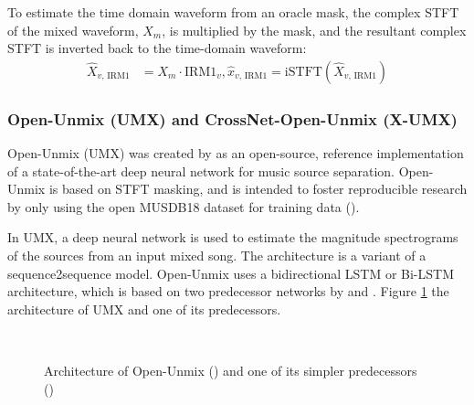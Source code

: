 \documentclass[report.tex]{subfiles}
\begin{document}
To estimate the time domain waveform from an oracle mask, the complex STFT of the mixed waveform, $X_{m}$, is multiplied by the mask, and the resultant complex STFT is inverted back to the time-domain waveform:
\begin{align}
	\nonumber \hat{X}_{v\text{, IRM1}} &= X_{m} \cdot \text{IRM1}_{v}, \hat{x}_{v\text{, IRM1}} = \text{iSTFT}(\hat{X}_{v\text{, IRM1}})
\end{align}

\newpagefill

\subsubsection{Open-Unmix (UMX) and CrossNet-Open-Unmix (X-UMX)}
\label{sec:umx}

Open-Unmix (UMX) was created by \textcite{umx} as an open-source, reference implementation of a state-of-the-art deep neural network for music source separation. Open-Unmix is based on STFT masking, and is intended to foster reproducible research by only using the open MUSDB18 dataset for training data (\cite{musdb18, musdb18hq}).

In UMX, a deep neural network is used to estimate the magnitude spectrograms of the sources from an input mixed song. The architecture is a variant of a sequence2sequence model. Open-Unmix uses a bidirectional LSTM or Bi-LSTM architecture, which is based on two predecessor networks by \textcite{umxorig1} and \textcite{umxorig2}. Figure \ref{fig:umxes} the architecture of UMX and one of its predecessors.

\begin{figure}[ht]
	\centering
	\\
	\caption{Architecture of Open-Unmix (\cite{umx}) and one of its simpler predecessors (\cite{umxorig1})}
	\label{fig:umxes}
\end{figure}
\end{document}
